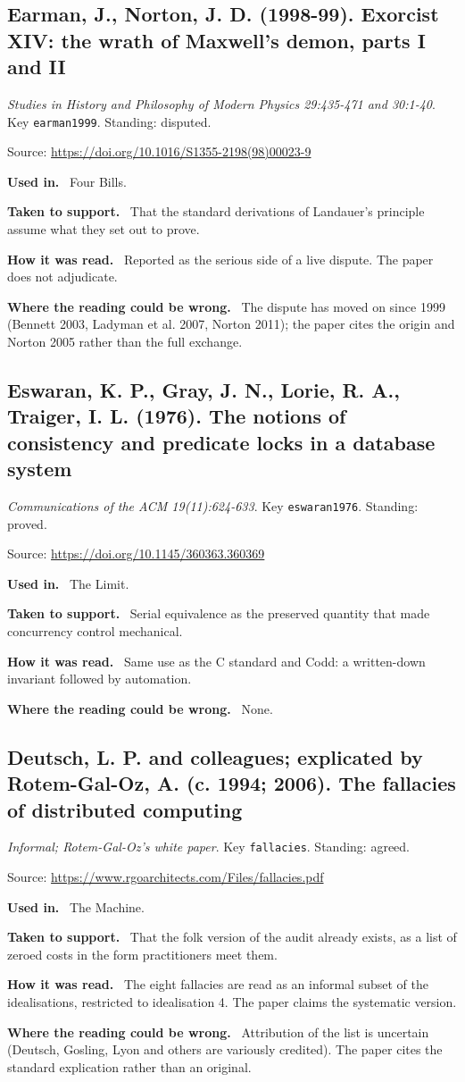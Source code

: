 \documentclass[11pt,oneside]{article}
\newcommand{\field}[1]{\par\noindent\textbf{\color{accent}#1.}\ }
\begin{document}
\hypertarget{src:earman1999}{}
\subsection*{Earman, J., Norton, J. D. (1998-99). Exorcist XIV: the wrath of Maxwell's demon, parts I and II}
\noindent\small\emph{Studies in History and Philosophy of Modern Physics 29:435-471 and 30:1-40}. Key \texttt{earman1999}. Standing: disputed.
\par\noindent\small Source: \url{https://doi.org/10.1016/S1355-2198(98)00023-9}
\normalsize
\field{Used in} Four Bills.
\field{Taken to support} That the standard derivations of Landauer's principle assume what they set out to prove.
\field{How it was read} Reported as the serious side of a live dispute. The paper does not adjudicate.
\field{Where the reading could be wrong} The dispute has moved on since 1999 (Bennett 2003, Ladyman et al. 2007, Norton 2011); the paper cites the origin and Norton 2005 rather than the full exchange.

\hypertarget{src:eswaran1976}{}
\subsection*{Eswaran, K. P., Gray, J. N., Lorie, R. A., Traiger, I. L. (1976). The notions of consistency and predicate locks in a database system}
\noindent\small\emph{Communications of the ACM 19(11):624-633}. Key \texttt{eswaran1976}. Standing: proved.
\par\noindent\small Source: \url{https://doi.org/10.1145/360363.360369}
\normalsize
\field{Used in} The Limit.
\field{Taken to support} Serial equivalence as the preserved quantity that made concurrency control mechanical.
\field{How it was read} Same use as the C standard and Codd: a written-down invariant followed by automation.
\field{Where the reading could be wrong} None.

\hypertarget{src:fallacies}{}
\subsection*{Deutsch, L. P. and colleagues; explicated by Rotem-Gal-Oz, A. (c. 1994; 2006). The fallacies of distributed computing}
\noindent\small\emph{Informal; Rotem-Gal-Oz's white paper}. Key \texttt{fallacies}. Standing: agreed.
\par\noindent\small Source: \url{https://www.rgoarchitects.com/Files/fallacies.pdf}
\normalsize
\field{Used in} The Machine.
\field{Taken to support} That the folk version of the audit already exists, as a list of zeroed costs in the form practitioners meet them.
\field{How it was read} The eight fallacies are read as an informal subset of the idealisations, restricted to idealisation 4. The paper claims the systematic version.
\field{Where the reading could be wrong} Attribution of the list is uncertain (Deutsch, Gosling, Lyon and others are variously credited). The paper cites the standard explication rather than an original.
\end{document}
